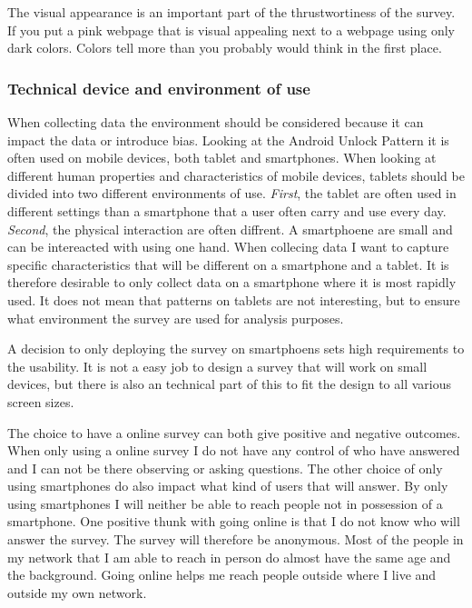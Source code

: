       The visual appearance is an important part of the thrustwortiness of the survey. If you put a pink webpage that is visual appealing next to a webpage using only dark colors. Colors tell more than you probably would think in the first place.


    \subsubsection*{Technical device and environment of use}
      When collecting data the environment should be considered because it can impact the data or introduce bias. Looking at the Android Unlock Pattern it is often used on mobile devices, both tablet and smartphones. When looking at different human properties and characteristics of mobile devices, tablets should be divided into two different environments of use. {\it First}, the tablet are often used in different settings than a smartphone that a user often carry and use every day. {\it Second}, the physical interaction are often diffrent. A smartphoene are small and can be intereacted with using one hand. When collecing data I want to capture specific characteristics that will be different on a smartphone and a tablet. It is therefore desirable to only collect data on a smartphone where it is most rapidly used. It does not mean that patterns on tablets are not interesting, but to ensure what environment the survey are used for analysis purposes. 

      A decision to only deploying the survey on smartphoens sets high requirements to the usability. It is not a easy job to design a survey that will work on small devices, but there is also an technical part of this to fit the design to all various screen sizes. 

      The choice to have a online survey can both give positive and negative outcomes. When only using a online survey I do not have any control of who have answered and I can not be there observing or asking questions. The other choice of only using smartphones do also impact what kind of users that will answer. By only using smartphones I will neither be able to reach people not in possession of a smartphone. One positive thunk with going online is that I do not know who will answer the survey. The survey will therefore be anonymous. Most of the people in my network that I am able to reach in person do almost have the same age and the background. Going online helps me reach people outside where I live and outside my own network.

